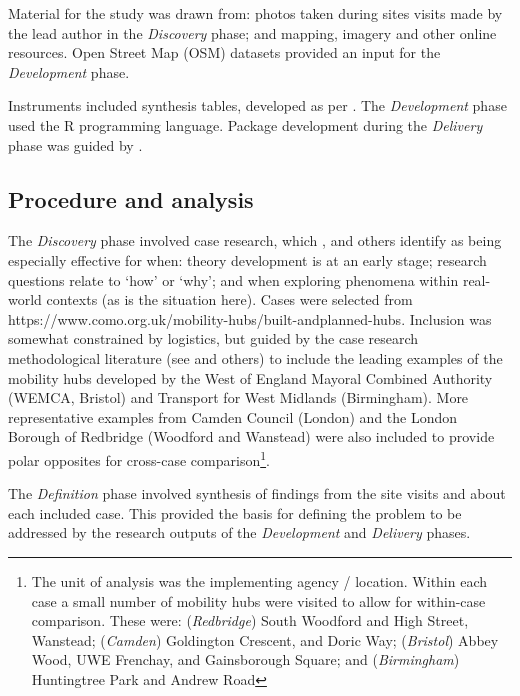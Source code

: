 \documentclass[preprint, 3p,
authoryear]{elsarticle} %
\begin{document}
Material for the study was drawn from: photos taken during sites visits
made by the lead author in the \emph{Discovery} phase; and mapping,
imagery and other online resources. Open Street Map (OSM) datasets
provided an input for the \emph{Development} phase.

Instruments included synthesis tables, developed as per
\citet{Miles:1994aa}. The \emph{Development} phase used the R
programming language. Package development during the \emph{Delivery}
phase was guided by \citet{wickham2023r}.

\subsection{Procedure and analysis}\label{procedure-and-analysis}

The \emph{Discovery} phase involved case research, which
\citet{Denscombe:2007aa}, \citet{Yin:2018ab} and others identify as
being especially effective for when: theory development is at an early
stage; research questions relate to `how' or `why'; and when exploring
phenomena within real-world contexts (as is the situation here). Cases
were selected from
https://www.como.org.uk/mobility-hubs/built-andplanned-hubs. Inclusion
was somewhat constrained by logistics, but guided by the case research
methodological literature (see \citet{Yin:2018ab} and others) to include
the leading examples of the mobility hubs developed by the West of
England Mayoral Combined Authority (WEMCA, Bristol) and Transport for
West Midlands (Birmingham). More representative examples from Camden
Council (London) and the London Borough of Redbridge (Woodford and
Wanstead) were also included to provide polar opposites for cross-case
comparison\footnote{The unit of analysis was the implementing agency /
  location. Within each case a small number of mobility hubs were
  visited to allow for within-case comparison. These were:
  (\emph{Redbridge}) South Woodford and High Street, Wanstead;
  (\emph{Camden}) Goldington Crescent, and Doric Way; (\emph{Bristol})
  Abbey Wood, UWE Frenchay, and Gainsborough Square; and
  (\emph{Birmingham}) Huntingtree Park and Andrew Road}.

The \emph{Definition} phase involved synthesis of findings from the site
visits and about each included case. This provided the basis for
defining the problem to be addressed by the research outputs of the
\emph{Development} and \emph{Delivery} phases.
\end{document}
